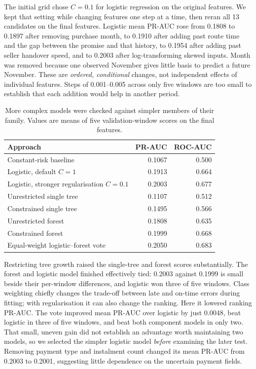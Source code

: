 \documentclass[11pt,a4paper]{article}
\begin{document}
The initial grid chose $C=0.1$ for logistic regression on the original features. We kept that setting while changing features one step at a time, then reran all 13 candidates on the final features. Logistic mean PR-AUC rose from 0.1808 to 0.1897 after removing purchase month, to 0.1910 after adding past route time and the gap between the promise and that history, to 0.1954 after adding past seller handover speed, and to 0.2003 after log-transforming skewed inputs. Month was removed because one observed November gives little basis to predict a future November. These are \emph{ordered, conditional} changes, not independent effects of individual features. Steps of 0.001--0.005 across only five windows are too small to establish that each addition would help in another period.

\begin{table}[h]
\centering\small
\caption{More complex models were checked against simpler members of their family. Values are means of five validation-window scores on the final features.}
\label{tab:models}
\begin{tabular}{@{}lrr@{}}
\toprule
Approach & PR-AUC & ROC-AUC \\
\midrule
Constant-risk baseline & 0.1067 & 0.500 \\
Logistic, default $C=1$ & 0.1913 & 0.664 \\
Logistic, stronger regularisation $C=0.1$ & 0.2003 & 0.677 \\
Unrestricted single tree & 0.1107 & 0.512 \\
Constrained single tree & 0.1495 & 0.566 \\
Unrestricted forest & 0.1808 & 0.635 \\
Constrained forest & 0.1999 & 0.668 \\
Equal-weight logistic--forest vote & 0.2050 & 0.683 \\
\bottomrule
\end{tabular}
\end{table}

Restricting tree growth raised the single-tree and forest scores substantially. The forest and logistic model finished effectively tied: 0.2003 against 0.1999 is small beside their per-window differences, and logistic won three of five windows. Class weighting chiefly changes the trade-off between late and on-time errors during fitting; with regularisation it can also change the ranking. Here it lowered ranking PR-AUC. The vote improved mean PR-AUC over logistic by just 0.0048, beat logistic in three of five windows, and beat both component models in only two. That small, uneven gain did not establish an advantage worth maintaining two models, so we selected the simpler logistic model \emph{before} examining the later test. Removing payment type and instalment count changed its mean PR-AUC from 0.2003 to 0.2001, suggesting little dependence on the uncertain payment fields.
\end{document}
